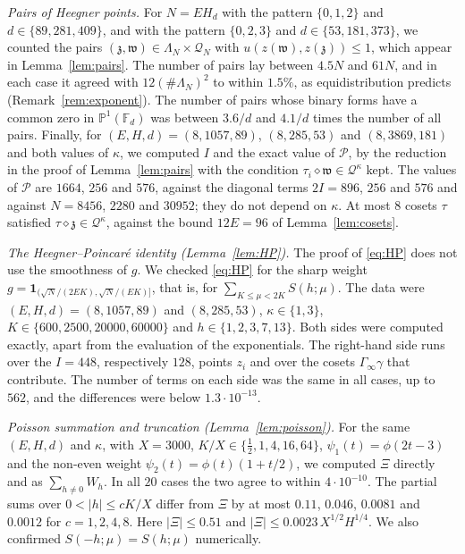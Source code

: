 \documentclass[11pt]{amsart}
\theoremstyle{remark}
\theoremstyle{definition}
\numberwithin{equation}{section}
\newcommand{\Qc}{\mathcal{Q}}
\newcommand{\Pc}{\mathcal{P}}
\newcommand{\gz}{\mathfrak{z}}
\newcommand{\gw}{\mathfrak{w}}
\newcommand{\one}{\mathbf{1}}
\begin{document}
\emph{Pairs of Heegner points.} For $N=EH_d$ with the pattern $\{0,1,2\}$ and $d\in\{89,281,409\}$, and with the pattern $\{0,2,3\}$ and $d\in\{53,181,373\}$, we counted the pairs $(\gz,\gw)\in\Lambda_N\times\Qc_N$ with $u(z(\gw),z(\gz))\le1$, which appear in Lemma~\ref{lem:pairs}. The number of pairs lay between $4.5N$ and $61N$, and in each case it agreed with $12(\#\Lambda_N)^2$ to within $1.5\%$, as equidistribution predicts (Remark~\ref{rem:exponent}). The number of pairs whose binary forms have a common zero in $\mathbb P^1(\mathbb F_d)$ was between $3.6/d$ and $4.1/d$ times the number of all pairs. Finally, for $(E,H,d)=(8,1057,89)$, $(8,285,53)$ and $(8,3869,181)$ and both values of $\kappa$, we computed $I$ and the exact value of $\Pc$, by the reduction in the proof of Lemma~\ref{lem:pairs} with the condition $\tau_i\diamond\gw\in\Qc^\kappa$ kept. The values of $\Pc$ are $1664$, $256$ and $576$, against the diagonal terms $2I=896$, $256$ and $576$ and against $N=8456$, $2280$ and $30952$; they do not depend on $\kappa$. At most $8$ cosets $\tau$ satisfied $\tau\diamond\gz\in\Qc^\kappa$, against the bound $12E=96$ of Lemma~\ref{lem:cosets}.

\emph{The Heegner--Poincar\'e identity (Lemma~\ref{lem:HP}).} The proof of \eqref{eq:HP} does not use the smoothness of $g$. We checked \eqref{eq:HP} for the sharp weight $g=\one_{(\sqrt N/(2EK),\sqrt N/(EK)]}$, that is, for $\sum_{K\le\mu<2K}S(h;\mu)$. The data were $(E,H,d)=(8,1057,89)$ and $(8,285,53)$, $\kappa\in\{1,3\}$, $K\in\{600,2500,20000,60000\}$ and $h\in\{1,2,3,7,13\}$. Both sides were computed exactly, apart from the evaluation of the exponentials. The right-hand side runs over the $I=448$, respectively $128$, points $z_i$ and over the cosets $\Gamma_\infty\gamma$ that contribute. The number of terms on each side was the same in all cases, up to $562$, and the differences were below $1.3\cdot10^{-13}$.

\emph{Poisson summation and truncation (Lemma~\ref{lem:poisson}).} For the same $(E,H,d)$ and $\kappa$, with $X=3000$, $K/X\in\{\frac12,1,4,16,64\}$, $\psi_1(t)=\phi(2t-3)$ and the non-even weight $\psi_2(t)=\phi(t)(1+t/2)$, we computed $\Xi$ directly and as $\sum_{h\ne0}W_h$. In all $20$ cases the two agree to within $4\cdot10^{-10}$. The partial sums over $0<|h|\le cK/X$ differ from $\Xi$ by at most $0.11$, $0.046$, $0.0081$ and $0.0012$ for $c=1,2,4,8$. Here $|\Xi|\le0.51$ and $|\Xi|\le0.0023\,X^{1/2}H^{1/4}$. We also confirmed $S(-h;\mu)=S(h;\mu)$ numerically.
\end{document}
